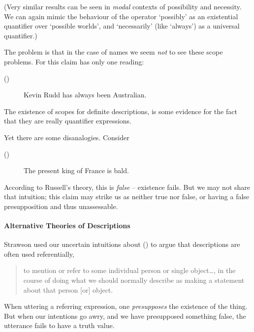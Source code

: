 (Very similar results can be seen in \emph{modal} contexts of possibility and necessity. We can again mimic the behaviour of the operator `possibly' as an existential quantifier over `possible worlds', and `necessarily' (like `always') as a universal quantifier.)

The problem is that in the case of names we seem \emph{not} to see these scope problems. For this claim has only one reading: \begin{description}
	\item [(\dag)] Kevin Rudd has always been Australian.
\end{description}The existence of scopes for definite descriptions, is some evidence for the fact that they are really quantifier expressions. 

Yet there are some disanalogies. Consider \begin{description}
	\item [(\ddag)] The present king of France is bald.
\end{description} According to Russell's theory, this is \emph{false} – existence fails. But we may not share that intuition; this claim may strike us as neither true nor false, or having a false presupposition and thus unassessable.


\paragraph{Alternative Theories of Descriptions}

Strawson used our uncertain intuitions about (\ddag) to argue that descriptions are often used referentially, \begin{quotation}
	to mention 	or refer to some individual person or single object\ldots, in the course 	of doing what we should normally describe as making a statement 
	about that person [or] object. 
\end{quotation} When uttering a referring expression, one \emph{presupposes} the existence of the thing. But when our intentions go awry, and we have presupposed something false, the utterance fails to have a truth value.

